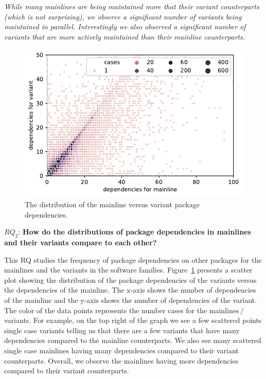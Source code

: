 \begin{framed}
\noindent
\emph{While many mainlines are being maintained more that their variant counterparts (which is not surprising), we  observe a significant number of variants being maintained in parallel. Interestingly we also observed a significant number of variants that are more actively maintained than their mainline counterparts.}
\end{framed}

\begin{figure}[htbp]
\vspace{-.3cm}
   \centering
    \includegraphics[scale=0.6]{figures/benevolj_dependencies.pdf}
    \caption{The distribution of the mainline versus variant package dependencies.}
    \label{fig:dependencies}
\end{figure}


$RQ_2$: \textbf{How do the distributions of package dependencies in mainlines and their variants compare to each other?}

This RQ studies the frequency of package dependencies on other packages for the mainlines and the variants in the software families. 
Figure~\ref{fig:dependencies} presents a scatter plot showing the distribution of the package dependencies of the variants versus the dependencies of the mainline.
The x-axis shows the number of dependencies of the mainline and
the y-axis shows the number of dependencies of the variant.
The color of the data points represents the number cases for the mainlines\,/\,variants.
For example, on the top right of the graph we see a few scattered points single case variants telling us that there are a few variants that have many dependencies compared to the mainline counterparts.
We also see many scattered single case mainlines having many dependencies compared to their variant counterparts. 
Overall, we observe the mainlines having more dependencies compared to their variant counterparts.

